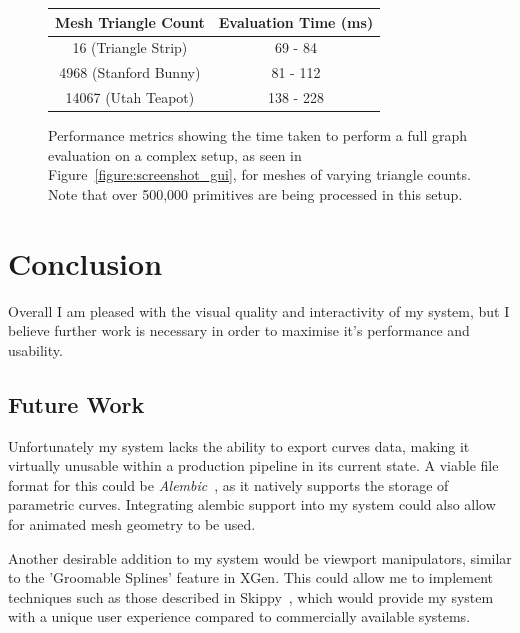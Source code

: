 \documentclass[]{acmsiggraph}
\begin{document}
\begin{figure}[htbp]\centering
\begin{center}
\begin{tabular}{||c|c||}
\hline
Mesh Triangle Count & Evaluation Time (ms)\\
\hline
\hline
16 (Triangle Strip) & 69 - 84\\
\hline
4968 (Stanford Bunny) & 81 - 112\\
\hline
14067 (Utah Teapot) & 138 - 228\\
\hline
\end{tabular}
\caption{\label{figure:fullPerformance} Performance metrics showing the time taken to perform a full graph evaluation on a complex setup, as seen in Figure~\ref{figure:screenshot_gui}, for meshes of varying triangle counts. Note that over 500,000 primitives are being processed in this setup.}
\end{center}
\end{figure}

\section{Conclusion} \label{sec:conclusion}

Overall I am pleased with the visual quality and interactivity of my system, but I believe further work is necessary in order to maximise it's performance and usability.


\subsection{Future Work} \label{sec:futurework}

Unfortunately my system lacks the ability to export curves data, making it virtually unusable within a production pipeline in its current state. A viable file format for this could be \textit{Alembic}~\cite{alembic}, as it natively supports the storage of parametric curves. Integrating alembic support into my system could also allow for animated mesh geometry to be used.

Another desirable addition to my system would be viewport manipulators, similar to the 'Groomable Splines' feature in XGen. This could allow me to implement techniques such as those described in Skippy~\cite{skippy}, which would provide my system with a unique user experience compared to commercially available systems.
\end{document}
